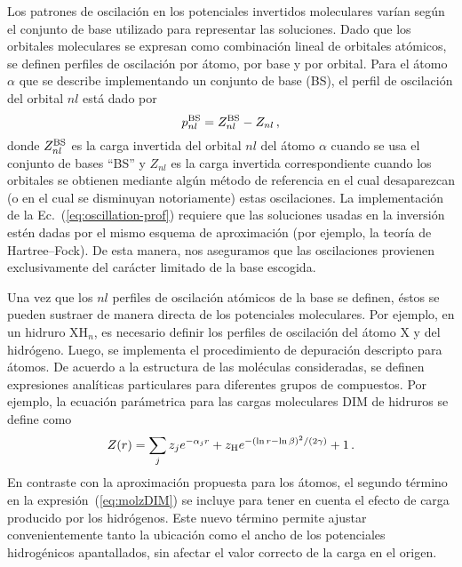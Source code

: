 Los patrones de oscilación en los potenciales invertidos moleculares 
varían según el conjunto de base utilizado para representar las 
soluciones. Dado que los orbitales moleculares se expresan como 
combinación lineal de orbitales atómicos, se definen perfiles de 
oscilación por átomo, por base y por orbital. Para el átomo $\alpha$ que 
se describe implementando un conjunto de base (BS), el perfil de 
oscilación del orbital $nl$ está dado por
\begin{equation}
 p_{nl}^{\mbox{\scriptsize BS}} = Z_{nl}^{\mbox{\scriptsize BS}}-
 Z_{nl} \,,
 \label{eq:oscillation-prof}
\end{equation}
donde $Z_{nl}^{\mbox{\scriptsize BS}}$ es la carga invertida del orbital
$nl$ del átomo $\alpha$ cuando se usa el conjunto de bases ``BS'' y 
$Z_{nl}$ es la carga invertida correspondiente cuando los orbitales se 
obtienen mediante algún método de referencia en el cual desaparezcan 
(o en el cual se disminuyan notoriamente) estas oscilaciones. La 
implementación de la Ec.~(\ref{eq:oscillation-prof}) requiere que las 
soluciones usadas en la 
inversión estén dadas por el mismo esquema de aproximación (por ejemplo, 
la teoría de Hartree--Fock). De esta manera, nos aseguramos que las 
oscilaciones provienen exclusivamente del carácter limitado de la base
escogida.

Una vez que los $nl$ perfiles de oscilación atómicos de la base se 
definen, éstos se pueden sustraer de manera directa de los potenciales 
moleculares. Por ejemplo, en un hidruro XH$_n$, es necesario definir los 
perfiles de oscilación del átomo X y del hidrógeno. Luego, se implementa 
el procedimiento de depuración descripto para átomos. De acuerdo a la 
estructura de las moléculas consideradas, se definen expresiones 
analíticas particulares para diferentes grupos de compuestos. Por 
ejemplo, la ecuación parámetrica para las cargas moleculares DIM de 
hidruros se define como
\begin{eqnarray}
 Z(r) = \sum_j z_j e^{-\alpha_j r} 
 + z_{\mbox{\scriptsize H}} e^{-(\ln r - \ln \beta)^2/(2\gamma)} 
 + 1\,.
 \label{eq:molzDIM}
\end{eqnarray}
En contraste con la aproximación propuesta para los átomos, el segundo 
término en la expresión~(\ref{eq:molzDIM}) se incluye para tener en 
cuenta el efecto de carga producido por los hidrógenos. Este nuevo 
término permite ajustar convenientemente tanto la ubicación como el 
ancho de los potenciales hidrogénicos apantallados, sin afectar el valor 
correcto de la carga en el origen.

